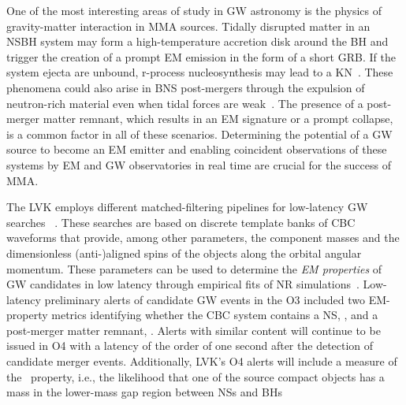 One of the most interesting areas of study in \ac{GW} astronomy is the physics of gravity-matter interaction in \ac{MMA} sources. Tidally disrupted matter in an
\ac{NSBH} system may form a high-temperature accretion disk around the \ac{BH} and trigger the creation of a prompt \ac{EM} emission in the form of a short \ac{GRB}. If
the system ejecta are unbound, r-process nucleosynthesis may lead to a \ac{KN}~\cite{Lattimer:1974slx, Li:1998bw, Korobkin:2012uy, Barnes:2013wka, Tanaka:2013ana,
Kasen:2014toa}. These phenomena could also arise in \ac{BNS} post-mergers through the expulsion of neutron-rich material even when tidal forces are weak~\cite{LIGOScientific:2017ync, Arcavi:2017xiz, Coulter:2017wya, Kasliwal:2017ngb, Lipunov:2017dwd, DES:2017kbs, Tanvir:2017pws}. The presence of a post-merger matter
remnant, which results in an \ac{EM} signature or a prompt collapse, is a common factor in all of these scenarios. Determining the potential of a \ac{GW} source to
become an \ac{EM} emitter and enabling coincident observations of these systems by \ac{EM} and \ac{GW} observatories in real time are crucial for the success of
\ac{MMA}.

The \ac{LVK} employs different matched-filtering pipelines for low-latency \ac{GW} searches~\cite{Sachdev:2020lfd,Nitz:2018rgo,Adams:2015ulm} . These searches are based on discrete template banks of \ac{CBC} waveforms that provide, among other parameters, the component masses and the
dimensionless (anti-)aligned spins of the objects along the orbital angular momentum. These parameters can be used to determine the \emph{\ac{EM} properties} of
\ac{GW} candidates in low latency through empirical fits of \ac{NR} simulations~\cite{Foucart:2012nc,Foucart:2018rjc}. Low-latency preliminary alerts of candidate
\ac{GW} events in the \ac{O3} included two \ac{EM}-property metrics identifying whether the \ac{CBC} system contains a \ac{NS}, \hasns, and a post-merger matter
remnant, \hasrem. Alerts with similar content will continue to be issued in \ac{O4} with a latency of the order of one second after the detection of candidate merger events.  Additionally, \ac{LVK}'s \ac{O4} alerts will include a measure of the \hasgap\ property, i.e., the likelihood that one of the source compact objects has a mass in the lower-mass gap region between \ac{NS}s and \ac{BH}s

